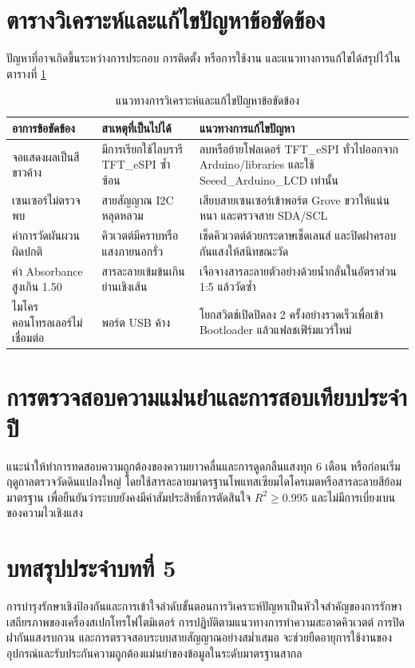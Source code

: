 \section{ตารางวิเคราะห์และแก้ไขปัญหาข้อขัดข้อง}
ปัญหาที่อาจเกิดขึ้นระหว่างการประกอบ การติดตั้ง หรือการใช้งาน และแนวทางการแก้ไขได้สรุปไว้ในตารางที่ \ref{tab:troubleshooting}

\begin{table}[H]
    \caption{แนวทางการวิเคราะห์และแก้ไขปัญหาข้อขัดข้อง}
    \label{tab:troubleshooting}
    \begin{tabularx}{\textwidth}{p{3.5cm}p{3.5cm}X}
        \toprule
        \textbf{อาการข้อขัดข้อง} & \textbf{สาเหตุที่เป็นไปได้} & \textbf{แนวทางการแก้ไขปัญหา} \\
        \midrule
        จอแสดงผลเป็นสีขาวค้าง & มีการเรียกใช้ไลบรารี TFT\_eSPI ซ้ำซ้อน & ลบหรือย้ายโฟลเดอร์ TFT\_eSPI ทั่วไปออกจาก Arduino/libraries และใช้ Seeed\_Arduino\_LCD เท่านั้น \\
        เซนเซอร์ไม่ตรวจพบ & สายสัญญาณ I2C หลุดหลวม & เสียบสายเซนเซอร์เข้าพอร์ต Grove ขวาให้แน่นหนา และตรวจสาย SDA/SCL \\
        ค่าการวัดผันผวนผิดปกติ & คิวเวตต์มีคราบหรือแสงภายนอกรั่ว & เช็ดคิวเวตต์ด้วยกระดาษเช็ดเลนส์ และปิดฝาครอบกันแสงให้สนิทขณะวัด \\
        ค่า Absorbance สูงเกิน 1.50 & สารละลายเข้มข้นเกินย่านเชิงเส้น & เจือจางสารละลายตัวอย่างด้วยน้ำกลั่นในอัตราส่วน 1:5 แล้ววัดซ้ำ \\
        ไมโครคอนโทรลเลอร์ไม่เชื่อมต่อ & พอร์ต USB ค้าง & โยกสวิตช์เปิดปิดลง 2 ครั้งอย่างรวดเร็วเพื่อเข้า Bootloader แล้วแฟลชเฟิร์มแวร์ใหม่ \\
        \bottomrule
    \end{tabularx}
\end{table}

\section{การตรวจสอบความแม่นยำและการสอบเทียบประจำปี}
แนะนำให้ทำการทดสอบความถูกต้องของความยาวคลื่นและการดูดกลืนแสงทุก 6 เดือน หรือก่อนเริ่มฤดูกาลตรวจวัดดินแปลงใหญ่ โดยใช้สารละลายมาตรฐานโพแทสเซียมไดโครเมตหรือสารละลายสีย้อมมาตรฐาน เพื่อยืนยันว่าระบบยังคงมีค่าสัมประสิทธิ์การตัดสินใจ $R^2 \ge 0.995$ และไม่มีการเบี่ยงเบนของความไวเชิงแสง

\section*{บทสรุปประจำบทที่ 5}
การบำรุงรักษาเชิงป้องกันและการเข้าใจลำดับขั้นตอนการวิเคราะห์ปัญหาเป็นหัวใจสำคัญของการรักษาเสถียรภาพของเครื่องสเปกโทรโฟโตมิเตอร์ การปฏิบัติตามแนวทางการทำความสะอาดคิวเวตต์ การปิดฝากันแสงรบกวน และการตรวจสอบระบบสายสัญญาณอย่างสม่ำเสมอ จะช่วยยืดอายุการใช้งานของอุปกรณ์และรับประกันความถูกต้องแม่นยำของข้อมูลในระดับมาตรฐานสากล

